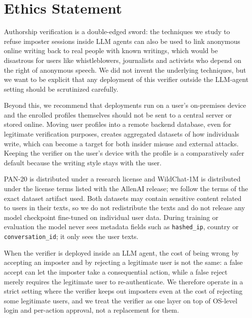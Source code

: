 \documentclass[11pt]{article}
\begin{document}
\section*{Ethics Statement}

Authorship verification is a double-edged sword: the techniques we study to refuse imposter sessions inside LLM agents can also be used to link anonymous online writing back to real people with known writings, which would be disastrous for users like whistleblowers, journalists and activists who depend on the right of anonymous speech. We did not invent the underlying techniques, but we want to be explicit that any deployment of this verifier outside the LLM-agent setting should be scrutinized carefully.

Beyond this, we recommend that deployments run on a user's on-premises device and the enrolled profiles themselves should not be sent to a central server or stored online. Moving user profiles into a remote backend database, even for legitimate verification purposes, creates aggregated datasets of how individuals write, which can become a target for both insider misuse and external attacks. Keeping the verifier on the user's device with the profile is a comparatively safer default because the writing style stays with the user.

PAN-20 is distributed under a research license and WildChat-1M is distributed under the license terms listed with the AllenAI release; we follow the terms of the exact dataset artifact used. Both datasets may contain sensitive content related to users in their texts, so we do not redistribute the texts and do not release any model checkpoint fine-tuned on individual user data. During training or evaluation the model never sees metadata fields such as \texttt{hashed\_ip}, country or \texttt{conversation\_id}; it only sees the user texts.

When the verifier is deployed inside an LLM agent, the cost of being wrong by accepting an imposter and by rejecting a legitimate user is not the same: a false accept can let the imposter take a consequential action, while a false reject merely requires the legitimate user to re-authenticate. We therefore operate in a strict setting where the verifier keeps out imposters even at the cost of rejecting some legitimate users, and we treat the verifier as one layer on top of OS-level login and per-action approval, not a replacement for them.


\end{document}
